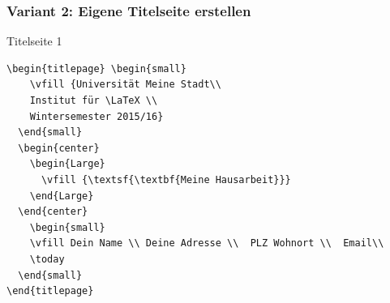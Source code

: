 \begin{frame}[fragile]
  \frametitle{Variant 2: Eigene Titelseite erstellen}

  \begin{block}{Titelseite 1}
    \begin{verbatim}
\begin{titlepage} \begin{small}
    \vfill {Universität Meine Stadt\\ 
    Institut für \LaTeX \\ 
    Wintersemester 2015/16}
  \end{small}
  \begin{center}
    \begin{Large}
      \vfill {\textsf{\textbf{Meine Hausarbeit}}}
    \end{Large}
  \end{center}
    \begin{small}
    \vfill Dein Name \\ Deine Adresse \\  PLZ Wohnort \\  Email\\ 
    \today
  \end{small}
\end{titlepage}
    \end{verbatim}
  \end{block}
\end{frame}